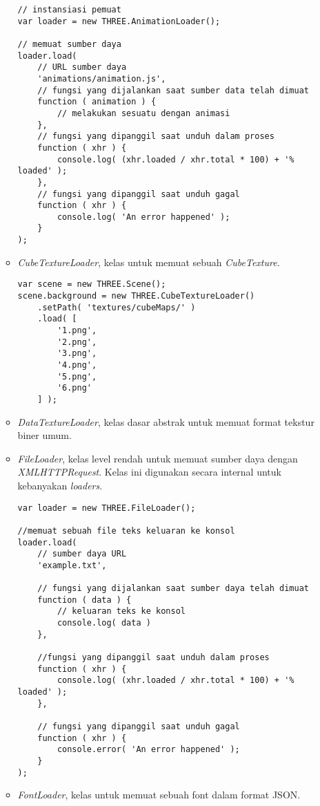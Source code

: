 \begin{itemize}
\begin{itemize}
\begin{lstlisting}
// instansiasi pemuat
var loader = new THREE.AnimationLoader();

// memuat sumber daya
loader.load(
	// URL sumber daya
	'animations/animation.js',
	// fungsi yang dijalankan saat sumber data telah dimuat
	function ( animation ) {
		// melakukan sesuatu dengan animasi
	},
	// fungsi yang dipanggil saat unduh dalam proses
	function ( xhr ) {
		console.log( (xhr.loaded / xhr.total * 100) + '% loaded' );
	},
	// fungsi yang dipanggil saat unduh gagal
	function ( xhr ) {
		console.log( 'An error happened' );
	}
);
\end{lstlisting}

	\item {\it CubeTextureLoader}, kelas untuk memuat sebuah {\it CubeTexture}.
	
\begin{lstlisting}
var scene = new THREE.Scene();
scene.background = new THREE.CubeTextureLoader()
	.setPath( 'textures/cubeMaps/' )
	.load( [
		'1.png',
		'2.png',
		'3.png',
		'4.png',
		'5.png',
		'6.png'
	] );
\end{lstlisting}

	\item {\it DataTextureLoader}, kelas dasar abstrak untuk memuat format tekstur biner umum.
	
	\item {\it FileLoader}, kelas level rendah untuk memuat sumber daya dengan {\it XMLHTTPRequest}. Kelas ini digunakan secara internal untuk kebanyakan {\it loaders}.
	
\begin{lstlisting}
var loader = new THREE.FileLoader();

//memuat sebuah file teks keluaran ke konsol
loader.load(
    // sumber daya URL
    'example.txt',

    // fungsi yang dijalankan saat sumber daya telah dimuat
    function ( data ) {
        // keluaran teks ke konsol
        console.log( data )
    },

    //fungsi yang dipanggil saat unduh dalam proses
    function ( xhr ) {
        console.log( (xhr.loaded / xhr.total * 100) + '% loaded' );
    },

    // fungsi yang dipanggil saat unduh gagal
    function ( xhr ) {
        console.error( 'An error happened' );
    }
);

\end{lstlisting}

	\item {\it FontLoader}, kelas untuk memuat sebuah font dalam format JSON.
	

\end{itemize}
\end{itemize}
